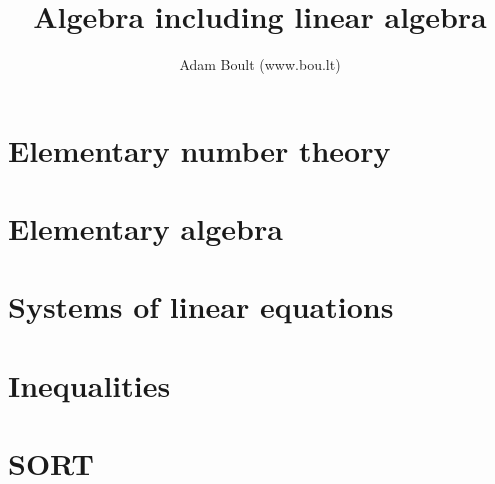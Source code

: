 \documentclass[oneside]{book}
\begin{document}
\author{Adam Boult (www.bou.lt)}
\title{Algebra including linear algebra}
\maketitle

\setcounter{tocdepth}{0}
\tableofcontents



\part{Elementary number theory}






\part{Elementary algebra}






\part{Systems of linear equations}




\part{Inequalities}


\part{SORT}

\end{document}
